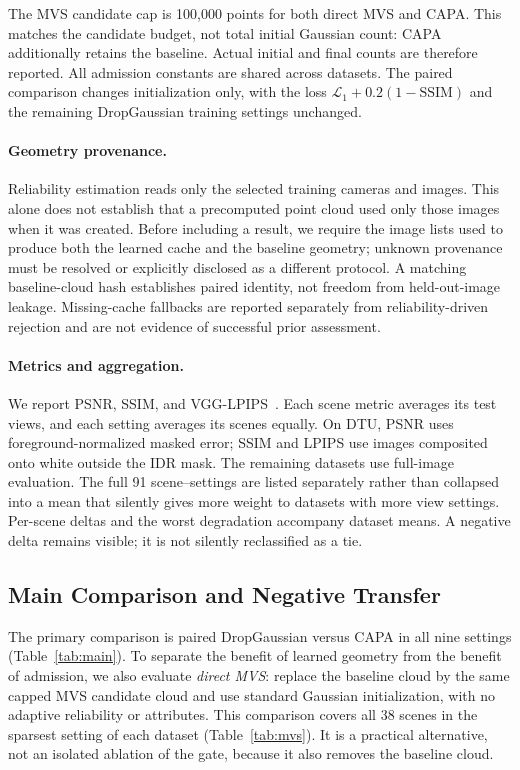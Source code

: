 \documentclass{article}
\newcommand{\ours}{CAPA}
\begin{document}
The MVS candidate cap is 100,000 points for both direct MVS and \ours{}. This matches the candidate budget, not total initial Gaussian count: \ours{} additionally retains the baseline. Actual initial and final counts are therefore reported. All admission constants are shared across datasets. The paired comparison changes initialization only, with the loss $\mathcal L_1+0.2(1-\mathrm{SSIM})$ and the remaining DropGaussian training settings unchanged.

\paragraph{Geometry provenance.}
Reliability estimation reads only the selected training cameras and images. This alone does not establish that a precomputed point cloud used only those images when it was created. Before including a result, we require the image lists used to produce both the learned cache and the baseline geometry; unknown provenance must be resolved or explicitly disclosed as a different protocol. A matching baseline-cloud hash establishes paired identity, not freedom from held-out-image leakage. Missing-cache fallbacks are reported separately from reliability-driven rejection and are not evidence of successful prior assessment.

\paragraph{Metrics and aggregation.}
We report PSNR, SSIM, and VGG-LPIPS~\citep{wang2004ssim,zhang2018lpips}. Each scene metric averages its test views, and each setting averages its scenes equally. On DTU, PSNR uses foreground-normalized masked error; SSIM and LPIPS use images composited onto white outside the IDR mask. The remaining datasets use full-image evaluation. The full 91 scene--settings are listed separately rather than collapsed into a mean that silently gives more weight to datasets with more view settings. Per-scene deltas and the worst degradation accompany dataset means. A negative delta remains visible; it is not silently reclassified as a tie.

\subsection{Main Comparison and Negative Transfer}
\label{sec:main-results}

The primary comparison is paired DropGaussian versus \ours{} in all nine settings (Table~\ref{tab:main}). To separate the benefit of learned geometry from the benefit of admission, we also evaluate \emph{direct MVS}: replace the baseline cloud by the same capped MVS candidate cloud and use standard Gaussian initialization, with no adaptive reliability or attributes. This comparison covers all 38 scenes in the sparsest setting of each dataset (Table~\ref{tab:mvs}). It is a practical alternative, not an isolated ablation of the gate, because it also removes the baseline cloud.
\end{document}
